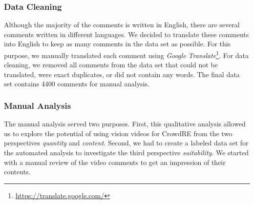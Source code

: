 \documentclass[conference]{IEEEtran}
\begin{document}
{\begin{table}[htbp]
	\renewcommand{\arraystretch}{1.3}
	\captionsetup{justification=justified}
	\centering
	\caption{Overview of the statistics of the vision video}
	\label{tbl:video_statistics}
\end{table}

\subsubsection{Data Cleaning}
Although the majority of the comments is written in English, there are several comments written in different languages. We decided to translate these comments into English to keep as many comments in the data set as possible. For this purpose, we manually translated each comment using \textit{Google Translate}\footnote{\url{https://translate.google.com/}}. For data cleaning, we removed all comments from the data set that could not be translated, were exact duplicates, or did not contain any words. The final data set contains 4400 comments for manual analysis.

\subsubsection{Manual Analysis}
The manual analysis served two purposes. First, this qualitative analysis allowed us to explore the potential of using vision videos for CrowdRE from the two perspectives \textit{quantity} and \textit{content}. Second, we had to create a labeled data set for the automated analysis to investigate the third perspective \textit{suitability}. We started with a manual review of the video comments to get an impression of their contents. %

}
\end{document}

